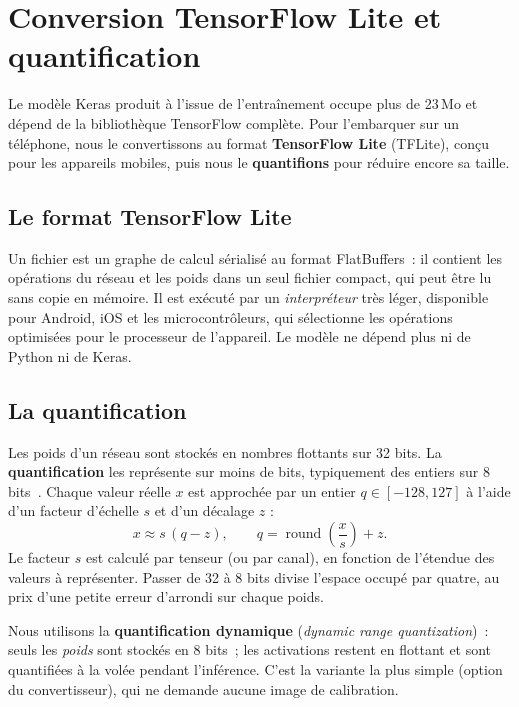 \chapter{Conversion TensorFlow Lite et quantification}\label{chap:tflite}

Le modèle Keras produit à l’issue de l’entraînement occupe plus de 23\,Mo et dépend de la bibliothèque TensorFlow complète. Pour l’embarquer sur un téléphone, nous le convertissons au format \textbf{TensorFlow Lite} (TFLite), conçu pour les appareils mobiles, puis nous le \textbf{quantifions} pour réduire encore sa taille.

\section{Le format TensorFlow Lite}

Un fichier  est un graphe de calcul sérialisé au format FlatBuffers~: il contient les opérations du réseau et les poids dans un seul fichier compact, qui peut être lu sans copie en mémoire. Il est exécuté par un \emph{interpréteur} très léger, disponible pour Android, iOS et les microcontrôleurs, qui sélectionne les opérations optimisées pour le processeur de l’appareil. Le modèle ne dépend plus ni de Python ni de Keras.

\section{La quantification}

Les poids d’un réseau sont stockés en nombres flottants sur 32 bits. La \textbf{quantification} les représente sur moins de bits, typiquement des entiers sur 8 bits~\cite{jacob2018}. Chaque valeur réelle $x$ est approchée par un entier $q\in[-128,127]$ à l’aide d’un facteur d’échelle $s$ et d’un décalage $z$ :
\begin{equation}
  x \approx s\,(q - z), \qquad q = \operatorname{round}\!\left(\frac{x}{s}\right)+z.
\end{equation}
Le facteur $s$ est calculé par tenseur (ou par canal), en fonction de l’étendue des valeurs à représenter. Passer de 32 à 8 bits divise l’espace occupé par quatre, au prix d’une petite erreur d’arrondi sur chaque poids.

Nous utilisons la \textbf{quantification dynamique} (\emph{dynamic range quantization})~: seuls les \emph{poids} sont stockés en 8 bits~; les activations restent en flottant et sont quantifiées à la volée pendant l’inférence. C’est la variante la plus simple (option  du convertisseur), qui ne demande aucune image de calibration.

